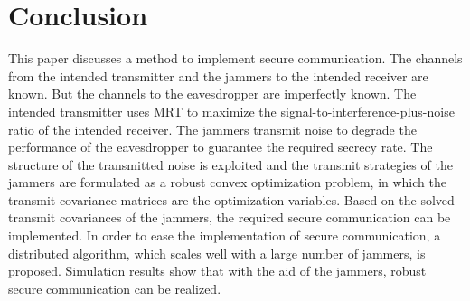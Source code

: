\documentclass[12pt, journal,onecolumn,draftclsnofoot]{IEEEtran}
\begin{document}




\section{Conclusion} \label{sec:conclusion}
This paper discusses a method to implement secure communication. The channels from the intended transmitter and the jammers to the intended receiver are known. But the channels to the eavesdropper are imperfectly known. The intended transmitter uses MRT to maximize the signal-to-interference-plus-noise ratio of the intended receiver. The jammers transmit noise to degrade the performance of the eavesdropper to guarantee the required secrecy rate. The structure of the transmitted noise is exploited and the transmit strategies of the jammers are formulated as a robust convex optimization problem, in which the transmit covariance matrices are the optimization variables. Based on the solved transmit covariances of the jammers, the required secure communication can be implemented. In order to ease the implementation of secure communication, a distributed algorithm, which scales well with a large number of jammers, is proposed. Simulation results show that with the aid of the jammers, robust secure communication can be realized.













\end{document}
